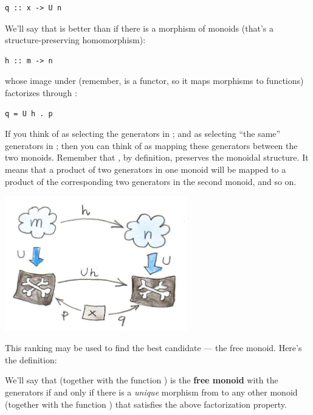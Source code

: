 \begin{Verbatim}[commandchars=\\\{\}]
q :: x -> U n
\end{Verbatim}

We'll say that  is better than  if there is a
morphism of monoids (that's a structure-preserving homomorphism):

\begin{Verbatim}[commandchars=\\\{\}]
h :: m -> n
\end{Verbatim}

whose image under  (remember,  is a functor, so it
maps morphisms to functions) factorizes through :

\begin{Verbatim}[commandchars=\\\{\}]
q = U h . p
\end{Verbatim}

If you think of  as selecting the generators in ;
and  as selecting ``the same'' generators in ; then
you can think of  as mapping these generators between the two
monoids. Remember that , by definition, preserves the monoidal
structure. It means that a product of two generators in one monoid will
be mapped to a product of the corresponding two generators in the second
monoid, and so on.

\includegraphics[width=3.12500in]{images/monoid-ranking.jpg}

This ranking may be used to find the best candidate --- the free monoid.
Here's the definition:

We'll say that  (together with the function ) is the
\textbf{free monoid} with the generators  if and only if there
is a \emph{unique} morphism  from  to any other
monoid  (together with the function ) that satisfies
the above factorization property.

